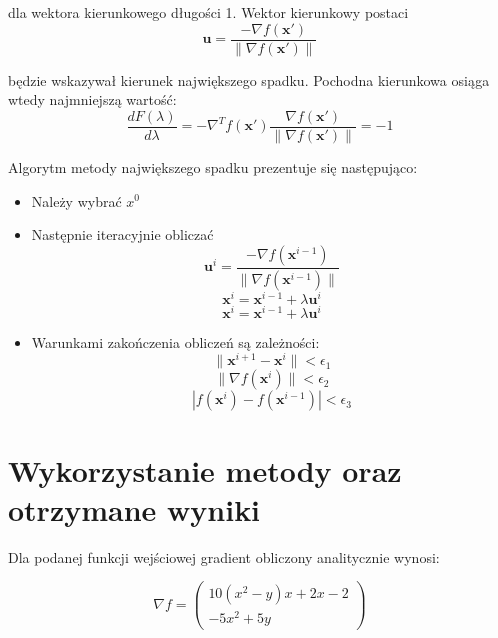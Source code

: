 \documentclass{article}
\begin{document}
\noindent
dla wektora kierunkowego długości 1. Wektor kierunkowy postaci
\begin{equation*}
\mathbf{u} = \frac{-\nabla f(\mathbf{x'})}{\|\nabla f(\mathbf{x'})\|}
\end{equation*}

\noindent
będzie wskazywał kierunek największego spadku. Pochodna kierunkowa osiąga wtedy najmniejszą wartość:
\begin{equation*}
\frac{dF(\lambda)}{d\lambda} = -\nabla^T f(\mathbf{x'}) \frac{\nabla f(\mathbf{x'})}{\|\nabla f(\mathbf{x'})\|} = -1
\end{equation*}

\noindent
Algorytm metody największego spadku prezentuje się następująco:
\begin{itemize}
    \item Należy wybrać $x^0$
    \item Następnie iteracyjnie obliczać 
        \begin{equation*}
\mathbf{u}^i = \frac{-\nabla f(\mathbf{x}^{i-1})}{\|\nabla f(\mathbf{x}^{i-1})\|}
\end{equation*}
\begin{equation*}
\mathbf{x}^i = \mathbf{x}^{i-1} + \lambda \mathbf{u}^i
\end{equation*}
\begin{equation*}
\mathbf{x}^i = \mathbf{x}^{i-1} + \lambda \mathbf{u}^i
\end{equation*}
    \item Warunkami zakończenia obliczeń są zależności:
    \begin{equation*}
    \|\mathbf{x}^{i+1} - \mathbf{x}^i\| < \epsilon_1
    \end{equation*}
    \begin{equation*}
    \|\nabla f(\mathbf{x}^i)\| < \epsilon_2
    \end{equation*}
    \begin{equation*}
    |f(\mathbf{x}^i) - f(\mathbf{x}^{i-1})| < \epsilon_3
    \end{equation*}
    
\end{itemize} 

\section{Wykorzystanie metody oraz otrzymane wyniki}
Dla podanej funkcji wejściowej gradient obliczony analitycznie wynosi:

\begin{equation*}
\nabla f = \begin{pmatrix} 10(x^2 - y)x + 2x - 2 \\ -5x^2 + 5y \end{pmatrix}
\end{equation*}
\end{document}
